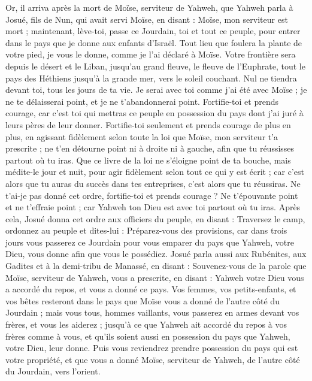 \begin{multicols}{2}
\VerseOne{}Or, il arriva après la mort de Moïse, serviteur de Yahweh, que Yahweh parla à Josué, fils de Nun, qui avait servi Moïse, en disant :
Moïse, mon serviteur est mort ; maintenant, lève-toi, passe ce Jourdain, toi et tout ce peuple, pour entrer dans le pays que je donne aux enfants d’Israël.
Tout lieu que foulera la plante de votre pied, je vous le donne, comme je l’ai déclaré à Moïse.
Votre frontière sera depuis le désert et le Liban, jusqu’au grand fleuve, le fleuve de l’Euphrate, tout le pays des Héthiens jusqu’à la grande mer, vers le soleil couchant.
Nul ne tiendra devant toi, tous les jours de ta vie. Je serai avec toi comme j’ai été avec Moïse ; je ne te délaisserai point, et je ne t’abandonnerai point.
Fortifie-toi et prends courage, car c’est toi qui mettras ce peuple en possession du pays dont j’ai juré à leurs pères de leur donner.
Fortifie-toi seulement et prends courage de plus en plus, en agissant fidèlement selon toute la loi que Moïse, mon serviteur t’a prescrite ; ne t’en détourne point ni à droite ni à gauche, afin que tu réussisses partout où tu iras.
Que ce livre de la loi ne s’éloigne point de ta bouche, mais médite-le jour et nuit, pour agir fidèlement selon tout ce qui y est écrit\FTNT{} ; car c’est alors que tu auras du succès dans tes entreprises, c’est alors que tu réussiras.
Ne t’ai-je pas donné cet ordre, fortifie-toi et prends courage ? Ne t’épouvante point et ne t’effraie point ; car Yahweh ton Dieu est avec toi partout où tu iras.
Après cela, Josué donna cet ordre aux officiers du peuple, en disant :
Traversez le camp, ordonnez au peuple et dites-lui : Préparez-vous des provisions, car dans trois jours vous passerez ce Jourdain pour vous emparer du pays que Yahweh, votre Dieu, vous donne afin que vous le possédiez.
Josué parla aussi aux Rubénites, aux Gadites et à la demi-tribu de Manassé, en disant :
Souvenez-vous de la parole que Moïse, serviteur de Yahweh, vous a prescrite, en disant : Yahweh votre Dieu vous a accordé du repos, et vous a donné ce pays.
Vos femmes, vos petits-enfants, et vos bêtes resteront dans le pays que Moïse vous a donné de l’autre côté du Jourdain ; mais vous tous, hommes vaillants, vous passerez en armes devant vos frères, et vous les aiderez ;
jusqu’à ce que Yahweh ait accordé du repos à vos frères comme à vous, et qu’ils soient aussi en possession du pays que Yahweh, votre Dieu, leur donne. Puis vous reviendrez prendre possession du pays qui est votre propriété, et que vous a donné Moïse, serviteur de Yahweh, de l’autre côté du Jourdain, vers l’orient.

\end{multicols}
